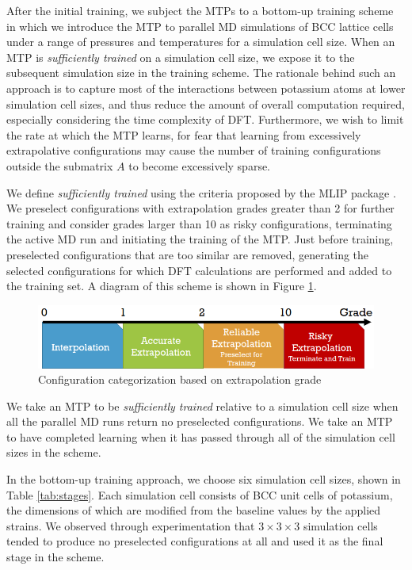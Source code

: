 \documentclass[9pt,twocolumn,twoside]{opticajnl}
\begin{document}
After the initial training, we subject the MTPs to a bottom-up training scheme in which we introduce the MTP to parallel MD simulations of BCC lattice cells under a range of pressures and temperatures for a simulation cell size. When an MTP is \textit{sufficiently trained} on a simulation cell size, we expose it to the subsequent simulation size in the training scheme. The rationale behind such an approach is to capture most of the interactions between potassium atoms at lower simulation cell sizes, and thus reduce the amount of overall computation required, especially considering the time complexity of DFT.  Furthermore, we wish to limit the rate at which the MTP learns, for fear that learning from excessively extrapolative configurations may cause the number of training configurations outside the submatrix $A$ to become excessively sparse. 

  We define \textit{sufficiently trained} using the criteria proposed by the MLIP package \cite{mlip}. We preselect configurations with extrapolation grades greater than 2 for further training and consider grades larger than 10 as risky configurations, terminating the active MD run and initiating the training of the MTP. Just before training, preselected configurations that are too similar are removed, generating the selected configurations for which DFT calculations are performed and added to the training set. A diagram of this scheme is shown in Figure \ref{fig:extrapolation}.

  \begin{figure}[ht]
    \centering
    \includegraphics[width=\linewidth]{assets/grade.png}
    \caption{Configuration categorization based on extrapolation grade}
    \label{fig:extrapolation}
  \end{figure}

  We take an MTP to be \textit{sufficiently trained} relative to a simulation cell size when all the parallel MD runs return no preselected configurations. We take an MTP to have completed learning when it has passed through all of the simulation cell sizes in the scheme.

  In the bottom-up training approach, we choose six simulation cell sizes, shown in Table \ref{tab:stages}. Each simulation cell consists of BCC unit cells of potassium, the dimensions of which are modified from the baseline values by the applied strains. We observed through experimentation that $3\times 3\times 3$ simulation cells tended to produce no preselected configurations at all and used it as the final stage in the scheme.
\end{document}
